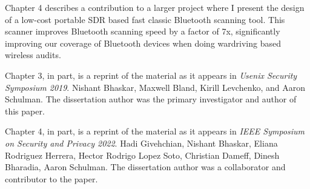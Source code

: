 Chapter 4 describes a contribution to a larger project where I present the design of a low-cost portable SDR based fast classic Bluetooth scanning tool. This scanner improves Bluetooth scanning speed by a factor of 7x, significantly improving our coverage of Bluetooth devices when doing wardriving based wireless audits.

Chapter 3, in part, is a reprint of the material as it appears in \textit{Usenix Security Symposium 2019}. Nishant Bhaskar, Maxwell Bland, Kirill Levchenko, and Aaron Schulman. The dissertation author was the primary investigator and author of this paper.

Chapter 4, in part, is a reprint of the material as it appears in \textit{IEEE Symposium on Security and Privacy 2022}. Hadi Givehchian, Nishant Bhaskar, Eliana Rodriguez Herrera, Hector Rodrigo Lopez Soto, Christian Dameff, Dinesh Bharadia, Aaron Schulman. The dissertation author was a collaborator and contributor to the paper.